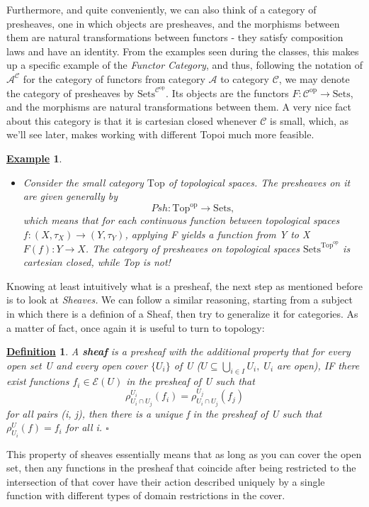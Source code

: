 \documentclass{article}
\newtheorem*{def*}{\underline{Definition}}
\newtheorem{example}{\underline{Example}}
\begin{document}
Furthermore, and quite conveniently, we can also think of a category of presheaves, one in which objects are presheaves, and the morphisms between them are natural transformations between functors - they satisfy composition laws and have an identity. From the examples seen during the classes, this makes up a specific example of the \textit{Functor Category}, and thus, following the notation of \(\mathcal{A}^{\mathcal{C}}\) for the category of functors from category \(\mathcal{A}\) to category \(\mathcal{C}\), we may denote the category of presheaves by \(\mathrm{Sets}^{\mathcal{C}^{\mathrm{op}}}\). Its objects are the functors \(F:\mathcal{C}^{\mathrm{op}}\rightarrow \mathrm{Sets}\), and the morphisms are natural transformations between them. A very nice fact about this category is that it is cartesian closed whenever \(\mathcal{C}\) is small, which, as we'll see later, makes working with different Topoi much more feasible.

\begin{example}
	\begin{itemize}
		\item[1)] Consider the small category \(\mathrm{Top}\) of topological spaces. The presheaves on it are given generally by
		      \[
			      Psh:\mathrm{Top}^{\mathrm{op}}\rightarrow \mathrm{Sets},
		      \]
		      which means that for each continuous function between topological spaces \(f:(X, \tau_{X})\rightarrow (Y, \tau_{Y})\), applying F yields a function from Y to X \(F(f):Y\rightarrow X\). The category of presheaves on topological spaces \(\mathrm{Sets}^{\mathrm{Top}^{\mathrm{op}}}\) is cartesian closed, while Top is not!
	\end{itemize}
\end{example}

Knowing at least intuitively what is a presheaf, the next step as mentioned before is to look at \textit{Sheaves.} We can follow a similar reasoning, starting from a subject in which there is a definion of a Sheaf, then try to generalize it for categories. As a matter of fact, once again it is useful to turn to topology:

\begin{def*}
	A \textbf{sheaf} is a presheaf with the additional property that for every open set U and every open cover \(\{U_{i}\}\) of U (\(U\subseteq \bigcup_{i\in I}^{}U_{i},\; U_{i}\) are open), IF there exist functions \(f_{i}\in \mathcal{E}(U)\) in the presheaf of U such that
	\[
		\rho_{U_{i}\cap U_{j}}^{U_{i}}(f_{i})=\rho_{U_{i}\cap U_{j}}^{U_{j}}(f_{j})
	\]
	for all pairs (i, j), then there is a unique f in the presheaf of U such that \(\rho_{U_{i}}^{U}(f) = f_{i}\) for all i. \(\square\)
\end{def*}
This property of sheaves essentially means that as long as you can cover the open set, then any functions in the presheaf that coincide after being restricted to the intersection of that cover have their action described uniquely by a single function with different types of domain restrictions in the cover.
\end{document}
